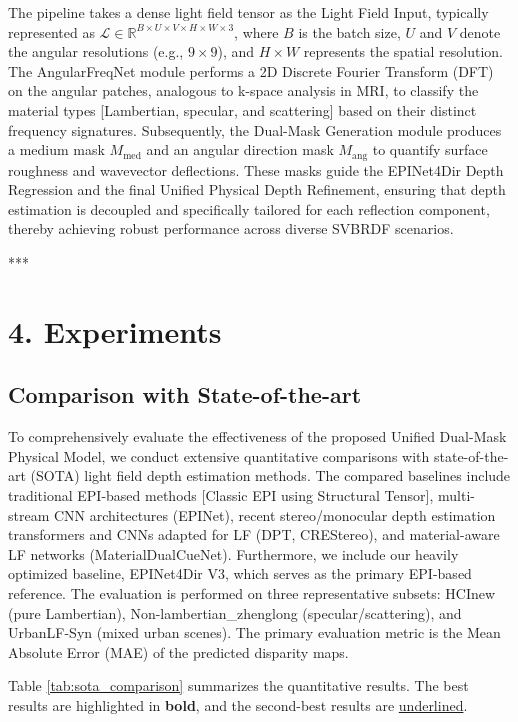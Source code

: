 The pipeline takes a dense light field tensor as the Light Field Input, typically represented as $\mathcal{L} \in \mathbb{R}^{B \times U \times V \times H \times W \times 3}$, where $B$ is the batch size, $U$ and $V$ denote the angular resolutions (e.g., $9 \times 9$), and $H \times W$ represents the spatial resolution. The AngularFreqNet module performs a 2D Discrete Fourier Transform (DFT) on the angular patches, analogous to k-space analysis in MRI, to classify the material types  [Lambertian, specular, and scattering] based on their distinct frequency signatures. Subsequently, the Dual-Mask Generation module produces a medium mask $M_{\text{med}}$ and an angular direction mask $M_{\text{ang}}$ to quantify surface roughness and wavevector deflections. These masks guide the EPINet4Dir Depth Regression and the final Unified Physical Depth Refinement, ensuring that depth estimation is decoupled and specifically tailored for each reflection component, thereby achieving robust performance across diverse SVBRDF scenarios.

***

\section{4. Experiments}

\subsection{Comparison with State-of-the-art}

To comprehensively evaluate the effectiveness of the proposed Unified Dual-Mask Physical Model, we conduct extensive quantitative comparisons with state-of-the-art (SOTA) light field depth estimation methods. The compared baselines include traditional EPI-based methods  [Classic EPI using Structural Tensor], multi-stream CNN architectures (EPINet), recent stereo/monocular depth estimation transformers and CNNs adapted for LF (DPT, CREStereo), and material-aware LF networks (MaterialDualCueNet). Furthermore, we include our heavily optimized baseline, EPINet4Dir V3, which serves as the primary EPI-based reference. The evaluation is performed on three representative subsets: HCInew (pure Lambertian), Non-lambertian\_zhenglong (specular/scattering), and UrbanLF-Syn (mixed urban scenes). The primary evaluation metric is the Mean Absolute Error (MAE) of the predicted disparity maps.

Table \ref{tab:sota_comparison} summarizes the quantitative results. The best results are highlighted in \textbf{bold}, and the second-best results are \underline{underlined}.


